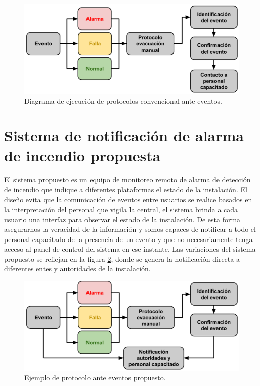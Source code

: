\begin{figure}[h]
	\centering
	\includegraphics[scale=.35]{./Figures/Capitulo1/FIG_B1.png}
	\caption{Diagrama de ejecución de protocolos convencional ante eventos.}
	\label{fig:figura_a2}
\end{figure}

\section{Sistema de notificación de alarma de incendio propuesta}

El sistema propuesto es un equipo de monitoreo remoto de alarma de detección de incendio que indique a diferentes plataformas el estado de la instalación. El diseño evita que la comunicación de eventos entre usuarios se realice basados en la interpretación del personal que vigila la central, el sistema brinda a cada usuario  una interfaz para observar el estado de la instalación. De esta forma asegurarnos la veracidad de la información y somos capaces de notificar a todo el personal capacitado de la presencia de un evento y que no necesariamente tenga acceso al panel de control del sistema en ese instante. Las variaciones del sistema propuesto se reflejan en la figura \ref{fig:figura_a3}, donde se genera la notificación directa a diferentes entes y autoridades de la instalación.  

\begin{figure}[h]
	\centering
	\includegraphics[scale=.35]{./Figures/Capitulo1/FIG_C1.png}
	\caption{Ejemplo de protocolo ante eventos propuesto.}
	\label{fig:figura_a3}
\end{figure}

